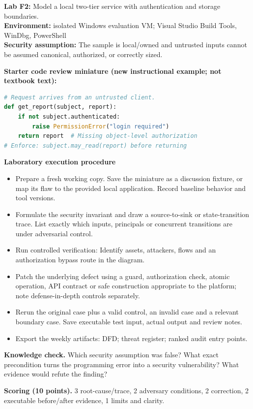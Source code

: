 \documentclass[10pt,letterpaper]{article}
\begin{document}
\begin{insight}\textbf{Lab F2:} Model a local two-tier service with authentication and storage boundaries.\\\textbf{Environment:} isolated Windows evaluation VM; Visual Studio Build Tools, WinDbg, PowerShell\\\textbf{Security assumption:} The sample is local/owned and untrusted inputs cannot be assumed canonical, authorized, or correctly sized.\end{insight}
\textbf{Starter code review miniature (new instructional example; not textbook text):}
\begin{lstlisting}[language=Python]
# Request arrives from an untrusted client.
def get_report(subject, report):
    if not subject.authenticated:
        raise PermissionError("login required")
    return report  # Missing object-level authorization
# Enforce: subject.may_read(report) before returning
\end{lstlisting}
\textbf{Laboratory execution procedure}
\begin{itemize}[leftmargin=*,itemsep=2pt]
\item Prepare a fresh working copy. Save the miniature as a discussion fixture, or map its flaw to the provided local application. Record baseline behavior and tool versions.
\item Formulate the security invariant and draw a source-to-sink or state-transition trace. List exactly which inputs, principals or concurrent transitions are under adversarial control.
\item Run controlled verification: Identify assets, attackers, flows and an authorization bypass route in the diagram.
\item Patch the underlying defect using a guard, authorization check, atomic operation, API contract or safe construction appropriate to the platform; note defense-in-depth controls separately.
\item Rerun the original case plus a valid control, an invalid case and a relevant boundary case. Save executable test input, actual output and review notes.
\item Export the weekly artifacts: DFD; threat register; ranked audit entry points.
\end{itemize}
\textbf{Knowledge check.} Which security assumption was false? What exact precondition turns the programming error into a security vulnerability? What evidence would refute the finding?

\textbf{Scoring (10 points).} 3 root-cause/trace, 2 adversary conditions, 2 correction, 2 executable before/after evidence, 1 limits and clarity.
\end{document}
